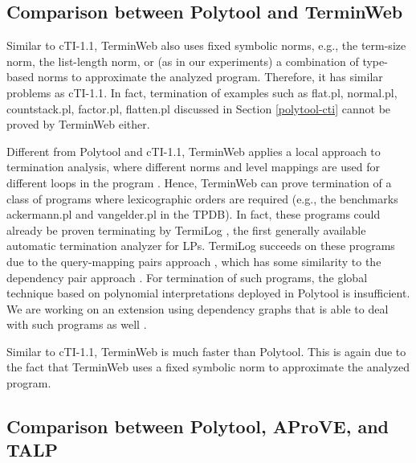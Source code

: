 \documentclass[envcountsame]{tlp}
\newcounter{ex:der-lastsymconsctr}
\begin{document}
\subsection{Comparison between \textsf{Polytool} and \textsf{TerminWeb}}
\label{polytool-terminweb}

Similar to \textsf{cTI-1.1}, \textsf{TerminWeb} also uses fixed symbolic norms,
e.g., the term-size norm, the list-length norm, or (as in our experiments) a
combination of type-based norms \cite{Bruynoogheetal07} to 
approximate the analyzed program. Therefore, it has similar problems as
\textsf{cTI-1.1}. In fact, termination of examples such as \textsf{flat.pl},
\textsf{normal.pl},
 \textsf{countstack.pl}, \textsf{factor.pl},
\textsf{flatten.pl} 
discussed in Section
\ref{polytool-cti} cannot be proved by \textsf{TerminWeb} either.

Different from \textsf{Polytool} and \textsf{cTI-1.1}, \textsf{TerminWeb}
applies a local approach to termination analysis, where different norms and
level mappings
are used for different loops in the program
\cite{Codishetal99}. Hence, \textsf{TerminWeb} can prove termination of a
class of programs where lexicographic orders are required (e.g., the
benchmarks \textsf{ackermann.pl} and \textsf{vangelder.pl} in the TPDB). 
In fact, these programs could already be proven terminating by \textsf{TermiLog}
\cite{lindenstrauss97,Termilog}, the first generally available automatic
termination analyzer for LPs. \textsf{TermiLog} succeeds on these programs due to the
query-mapping pairs approach \cite{Lindenstrauss}, which has some similarity to the
dependency pair approach \cite{ArtsGiesl00,JAR07,Hirokawa_Middeldorp04}.
For termination of such programs, the global technique
based on polynomial interpretations deployed in \textsf{Polytool} is
insufficient. We are working on an extension using dependency graphs
that is able to deal with such
programs as well
\cite{Nguyenetall-LOPSTR07,LOPSTR09}.


Similar to \textsf{cTI-1.1}, \textsf{TerminWeb} is much faster than
\textsf{Polytool}. This is again due to the fact that \textsf{TerminWeb} uses
a fixed symbolic norm to approximate the analyzed program. 

\subsection{Comparison between \textsf{Polytool}, \textsf{AProVE}, and \textsf{TALP}}
\end{document}
